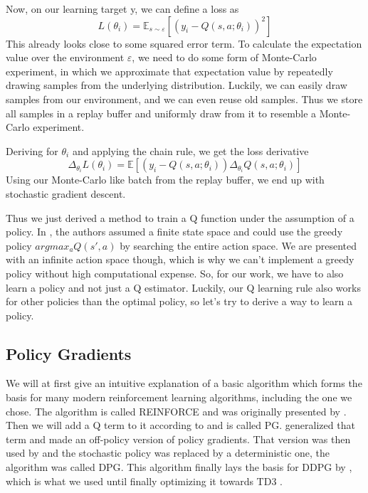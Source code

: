 \documentclass[hyperref,german,beleg]{cgvpub}
\begin{document}
Now, on our learning target y, we can define a loss as
\begin{equation}
L(\theta_i) = \mathbb{E}_{s \sim \varepsilon}[(y_i - Q(s, a;\theta_i))^2]
\end{equation}
This already looks close to some squared error term. To calculate the expectation value over the environment $\varepsilon$, we need to do some form of Monte-Carlo experiment, in which we approximate that expectation value by repeatedly drawing samples from the underlying distribution. Luckily, we can easily draw samples from our environment, and we can even reuse old samples. Thus we store all samples in a replay buffer and uniformly draw from it to resemble a Monte-Carlo experiment. 

Deriving for $\theta_i$ and applying the chain rule, we get the loss derivative
\begin{equation}
\Delta_{\theta_i} L(\theta_i) = \mathbb{E}[(y_i - Q(s, a;\theta_i))\Delta_{\theta_i}Q(s, a;\theta_i)]
\end{equation}
Using our Monte-Carlo like batch from the replay buffer, we end up with stochastic gradient descent.

Thus we just derived a method to train a Q function under the assumption of a policy. In \cite{mnihPlayingAtariDeep2013}, the authors assumed a finite state space and could use the greedy policy $argmax_a Q(s', a)$ by searching the entire action space. We are presented with an infinite action space though, which is why we can't implement a greedy policy without high computational expense. So, for our work, we have to also learn a policy and not just a Q estimator. Luckily, our Q learning rule also works for other policies than the optimal policy, so let's try to derive a way to learn a policy.


\subsection{Policy Gradients}

We will at first give an intuitive explanation of a basic algorithm which forms the basis for many modern reinforcement learning algorithms, including the one we chose. The algorithm is called REINFORCE and was originally presented by \cite{williamsSimpleStatisticalGradientfollowing}. Then we will add a Q term to it according to \cite{suttonPolicyGradientMethods} and is called \ac{PG}. \cite{degrisOffPolicyActorCritic2013} generalized that term and made an off-policy version of policy gradients. That version was then used by \cite{silverDeterministicPolicyGradient2013} and the stochastic policy was replaced by a deterministic one, the algorithm was called \ac{DPG}. This algorithm finally lays the basis for \ac{DDPG} by \cite{lillicrapCONTINUOUSCONTROLDEEP2015}, which is what we used until finally optimizing it towards \ac{TD3} \cite{fujimotoAddressingFunctionApproximation2018}.
\end{document}
